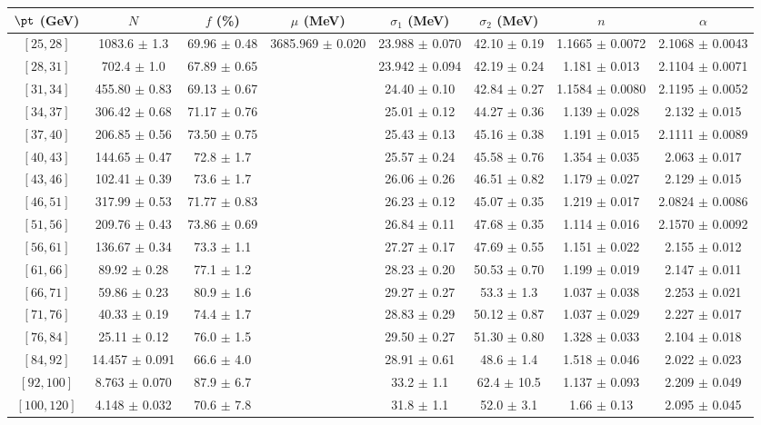 \begin{tabular}{c||c|c|c|c|c|c|c}
$\pt$ (GeV) & $N$ & $f$ (\%) & $\mu$ (MeV) & $\sigma_1$ (MeV) & $\sigma_2$ (MeV) & $n$ & $\alpha$ \\
\hline
$[25, 28]$ & 1083.6 $\pm$ 1.3 & 69.96 $\pm$ 0.48 & \multirow{17}{*}{3685.969 $\pm$ 0.020} & 23.988 $\pm$ 0.070 & 42.10 $\pm$ 0.19 & 1.1665 $\pm$ 0.0072 & 2.1068 $\pm$ 0.0043\\
$[28, 31]$ & 702.4 $\pm$ 1.0 & 67.89 $\pm$ 0.65 &  & 23.942 $\pm$ 0.094 & 42.19 $\pm$ 0.24 & 1.181 $\pm$ 0.013 & 2.1104 $\pm$ 0.0071\\
$[31, 34]$ & 455.80 $\pm$ 0.83 & 69.13 $\pm$ 0.67 &  & 24.40 $\pm$ 0.10 & 42.84 $\pm$ 0.27 & 1.1584 $\pm$ 0.0080 & 2.1195 $\pm$ 0.0052\\
$[34, 37]$ & 306.42 $\pm$ 0.68 & 71.17 $\pm$ 0.76 &  & 25.01 $\pm$ 0.12 & 44.27 $\pm$ 0.36 & 1.139 $\pm$ 0.028 & 2.132 $\pm$ 0.015\\
$[37, 40]$ & 206.85 $\pm$ 0.56 & 73.50 $\pm$ 0.75 &  & 25.43 $\pm$ 0.13 & 45.16 $\pm$ 0.38 & 1.191 $\pm$ 0.015 & 2.1111 $\pm$ 0.0089\\
$[40, 43]$ & 144.65 $\pm$ 0.47 & 72.8 $\pm$ 1.7 &  & 25.57 $\pm$ 0.24 & 45.58 $\pm$ 0.76 & 1.354 $\pm$ 0.035 & 2.063 $\pm$ 0.017\\
$[43, 46]$ & 102.41 $\pm$ 0.39 & 73.6 $\pm$ 1.7 &  & 26.06 $\pm$ 0.26 & 46.51 $\pm$ 0.82 & 1.179 $\pm$ 0.027 & 2.129 $\pm$ 0.015\\
$[46, 51]$ & 317.99 $\pm$ 0.53 & 71.77 $\pm$ 0.83 &  & 26.23 $\pm$ 0.12 & 45.07 $\pm$ 0.35 & 1.219 $\pm$ 0.017 & 2.0824 $\pm$ 0.0086\\
$[51, 56]$ & 209.76 $\pm$ 0.43 & 73.86 $\pm$ 0.69 &  & 26.84 $\pm$ 0.11 & 47.68 $\pm$ 0.35 & 1.114 $\pm$ 0.016 & 2.1570 $\pm$ 0.0092\\
$[56, 61]$ & 136.67 $\pm$ 0.34 & 73.3 $\pm$ 1.1 &  & 27.27 $\pm$ 0.17 & 47.69 $\pm$ 0.55 & 1.151 $\pm$ 0.022 & 2.155 $\pm$ 0.012\\
$[61, 66]$ & 89.92 $\pm$ 0.28 & 77.1 $\pm$ 1.2 &  & 28.23 $\pm$ 0.20 & 50.53 $\pm$ 0.70 & 1.199 $\pm$ 0.019 & 2.147 $\pm$ 0.011\\
$[66, 71]$ & 59.86 $\pm$ 0.23 & 80.9 $\pm$ 1.6 &  & 29.27 $\pm$ 0.27 & 53.3 $\pm$ 1.3 & 1.037 $\pm$ 0.038 & 2.253 $\pm$ 0.021\\
$[71, 76]$ & 40.33 $\pm$ 0.19 & 74.4 $\pm$ 1.7 &  & 28.83 $\pm$ 0.29 & 50.12 $\pm$ 0.87 & 1.037 $\pm$ 0.029 & 2.227 $\pm$ 0.017\\
$[76, 84]$ & 25.11 $\pm$ 0.12 & 76.0 $\pm$ 1.5 &  & 29.50 $\pm$ 0.27 & 51.30 $\pm$ 0.80 & 1.328 $\pm$ 0.033 & 2.104 $\pm$ 0.018\\
$[84, 92]$ & 14.457 $\pm$ 0.091 & 66.6 $\pm$ 4.0 &  & 28.91 $\pm$ 0.61 & 48.6 $\pm$ 1.4 & 1.518 $\pm$ 0.046 & 2.022 $\pm$ 0.023\\
$[92, 100]$ & 8.763 $\pm$ 0.070 & 87.9 $\pm$ 6.7 &  & 33.2 $\pm$ 1.1 & 62.4 $\pm$ 10.5 & 1.137 $\pm$ 0.093 & 2.209 $\pm$ 0.049\\
$[100, 120]$ & 4.148 $\pm$ 0.032 & 70.6 $\pm$ 7.8 &  & 31.8 $\pm$ 1.1 & 52.0 $\pm$ 3.1 & 1.66 $\pm$ 0.13 & 2.095 $\pm$ 0.045\\
\end{tabular}
